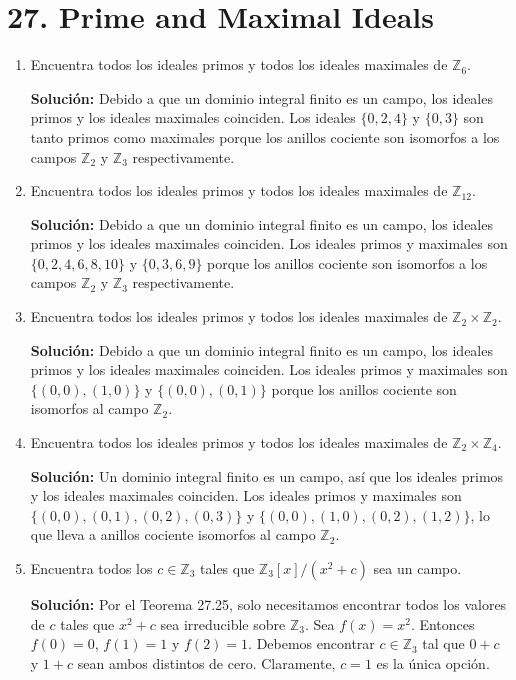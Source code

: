 
\section*{27. Prime and Maximal Ideals}

\begin{enumerate}
\item Encuentra todos los ideales primos y todos los ideales maximales de $\mathbb{Z}_6$.

\textbf{Solución:} Debido a que un dominio integral finito es un campo, los ideales primos y los ideales maximales coinciden. Los ideales $\{0, 2, 4\}$ y $\{0, 3\}$ son tanto primos como maximales porque los anillos cociente son isomorfos a los campos $\mathbb{Z}_2$ y $\mathbb{Z}_3$ respectivamente.

\item Encuentra todos los ideales primos y todos los ideales maximales de $\mathbb{Z}_12$.

\textbf{Solución:} Debido a que un dominio integral finito es un campo, los ideales primos y los ideales maximales coinciden. Los ideales primos y maximales son $\{0, 2, 4, 6, 8, 10\}$ y $\{0, 3, 6, 9\}$ porque los anillos cociente son isomorfos a los campos $\mathbb{Z}_2$ y $\mathbb{Z}_3$ respectivamente.

\item Encuentra todos los ideales primos y todos los ideales maximales de $\mathbb{Z}_2 \times \mathbb{Z}_2$.

\textbf{Solución:} Debido a que un dominio integral finito es un campo, los ideales primos y los ideales maximales coinciden. Los ideales primos y maximales son $\{(0, 0), (1, 0)\}$ y $\{(0, 0), (0, 1)\}$ porque los anillos cociente son isomorfos al campo $\mathbb{Z}_2$.

\item Encuentra todos los ideales primos y todos los ideales maximales de $\mathbb{Z}_2 \times \mathbb{Z}_4$.

\textbf{Solución:} Un dominio integral finito es un campo, así que los ideales primos y los ideales maximales coinciden. Los ideales primos y maximales son $\{(0, 0), (0, 1), (0, 2), (0, 3)\}$ y $\{(0, 0), (1, 0), (0, 2), (1, 2)\}$, lo que lleva a anillos cociente isomorfos al campo $\mathbb{Z}_2$.

\item Encuentra todos los $c \in \mathbb{Z}_3$ tales que $\mathbb{Z}_3[x]/(x^2 + c)$ sea un campo.

\textbf{Solución:} Por el Teorema 27.25, solo necesitamos encontrar todos los valores de $c$ tales que $x^2 + c$ sea irreducible sobre $\mathbb{Z}_3$. Sea $f(x) = x^2$. Entonces $f(0) = 0$, $f(1) = 1$ y $f(2) = 1$. Debemos encontrar $c \in \mathbb{Z}_3$ tal que $0 + c$ y $1 + c$ sean ambos distintos de cero. Claramente, $c = 1$ es la única opción.


\end{enumerate}
